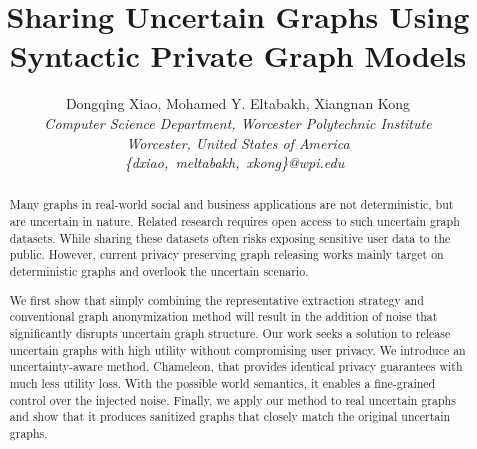 \documentclass[10pt,conference,letterpaper]{IEEEtran}
\title{Sharing Uncertain Graphs Using Syntactic Private Graph Models}
\author{%
{Dongqing Xiao, Mohamed Y. Eltabakh, Xiangnan Kong}%
\vspace{1.4mm}\\
\fontsize{10}{10}\selectfont\itshape
Computer Science Department, Worcester Polytechnic Institute \\
Worcester, United States of America\\
\fontsize{9}{9}\selectfont\ttfamily\upshape
\{dxiao,~meltabakh,~xkong\}@wpi.edu\
}
\theoremstyle{plain}
\begin{document}
\maketitle


%

\begin{abstract}  
Many graphs in real-world social and business applications are not deterministic, but are uncertain in nature. 
Related research requires open access to such uncertain graph datasets. While sharing these datasets often risks exposing 
sensitive user data to the public. 
However, current privacy preserving graph releasing works mainly target on deterministic graphs and overlook the uncertain scenario. 

We first show that simply combining the representative extraction strategy and conventional graph anonymization method will result in the addition of noise that significantly disrupts uncertain graph structure. 
Our work seeks a solution to release uncertain graphs with high utility without compromising user privacy. We introduce an uncertainty-aware method, Chameleon, that provides identical privacy guarantees with much less utility loss. With the possible world semantics, it enables a fine-grained control over the injected noise. Finally, we apply our method to real uncertain graphs and show that it produces sanitized graphs that closely match the original uncertain graphs. 
\end{abstract}



% 
% 
% 
% 
% 

% 

\end{document}
